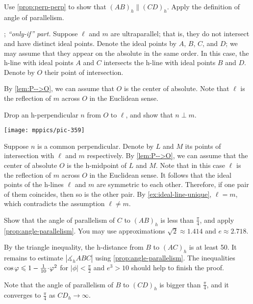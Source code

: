 \begin{multicols}{2}
 Use \ref{prop:perp-perp} to show that $(AB)_h\parallel (CD)_h$.
Apply the definition of angle of parallelism.

\parbf{\ref{ex:ultra-parallel}}; \textit{``only-if'' part.} Suppose $\ell$ and $m$ are ultraparallel; that is, they do not intersect and have distinct ideal points.
Denote the ideal points by $A$, $B$, $C$, and $D$;
we may assume that they appear on the absolute in the same order.
In this case, the h-line with ideal points $A$ and $C$ intersects the h-line with ideal points $B$ and $D$.
Denote by $O$ their point of intersection.

By \ref{lem:P-->O}, we can assume that $O$ is the center of absolute.
Note that $\ell$ is the reflection of $m$ across $O$ in the Euclidean sense.

Drop an h-perpendicular $n$ from $O$ to $\ell$, and
show that $n\perp m$.

\begin{Figure}
\vskip-0mm
\centering
\texttt{[image: mppics/pic-359]}
\end{Figure}

Suppose $n$ is a common perpendicular.
Denote by $L$ and $M$ its points of intersection with $\ell$ and $m$ respectively.
By \ref{lem:P-->O}, we can assume that the center of absolute $O$ is the h-midpoint of $L$ and $M$.
Note that in this case $\ell$ is the reflection of $m$ across $O$ in the Euclidean sense.
It follows that the ideal points of the h-lines $\ell$ and $m$ are symmetric to each other.
Therefore, if one pair of them coincides, then so is the other pair. 
By \ref{ex:ideal-line-unique}, $\ell=m$, which contradicts the assumption $\ell\ne m$.

 Show that the angle of parallelism of $C$ to $(AB)_h$ is less than $\tfrac\pi4$, and apply \ref{prop:angle-parallelism}.
You may use approximations $\sqrt2\approx 1.414$ and $e\approx2.718$.


By the triangle inequality, the h-distance from $B$ to $(AC)_h$ is at least 50.
It remains to estimate $|\measuredangle_h ABC|$ using \ref{prop:angle-parallelism}.
The inequalities $\cos\phi\z\le 1-\tfrac1{10}\cdot\phi^2$ for $|\phi|<\tfrac\pi2$ and $e^3>10$ should help to finish the proof.

Note that the angle of parallelism of $B$ to $(CD)_h$ is bigger than $\tfrac\pi4$,
and it converges to $\tfrac\pi4$ as $CD_h\to\infty$.


\end{multicols}
